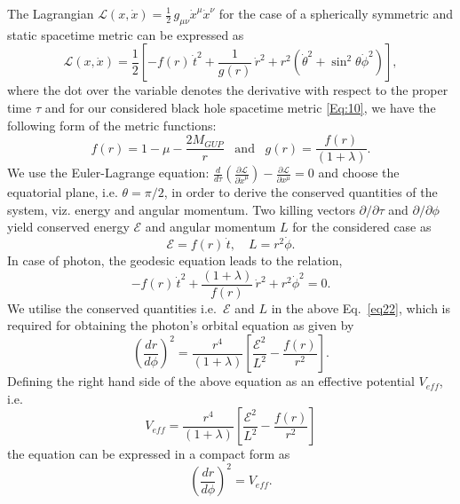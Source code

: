\documentclass[aps,amsmath,amssymb,showpacs,showkeys]{revtex4}
\begin{document}
The Lagrangian $\mathcal{L}(x,\dot{x})=\frac{1}{2}\,g_{\mu\nu}\dot{x}^{\mu}\dot{x}^{\nu}$ for the case of a spherically symmetric and static spacetime metric 
can be expressed as \cite{shnew02}
\begin{equation}
\mathcal{L}(x,\dot{x})=\frac{1}{2}\left[-f(r)\,\dot{t}^{2}+\frac{1}{g(r)}\,\dot{r}^{2}+r^{2}\left(\dot{\theta}^{2}+\sin^{2}\theta\dot{\phi}^{2}\right)\right],
\end{equation}
where the dot over the variable denotes the derivative with respect to the 
proper time $\tau$ and for our considered black hole spacetime metric 
\eqref{Eq:10}, we have the following form of the metric functions:
 $$f(r)=1-\mu-\frac{2M_{GUP}}{r} \;\;\; \text{and} \;\;\;
g(r) = \frac{f(r)}{(1+\lambda)}.$$ 
We use the Euler-Lagrange equation: 
$\frac{d}{d\tau}\!\left(\frac{\partial\mathcal{L}}{\partial\dot{x}^{\mu}}\right)-\frac{\partial\mathcal{L}}{\partial x^{\mu}}=0$ and choose the equatorial 
plane, i.e. $\theta=\pi/2$, in order to derive the conserved quantities of the
system, viz. energy and angular momentum. Two killing vectors 
$\partial/\partial \tau$ and $\partial/\partial \phi$ yield conserved energy 
$\mathcal{E}$ and angular momentum $L$ for the considered case as
\begin{equation}
\mathcal{E}=f(r)\,\dot{t},\quad L=r^{2}\dot{\phi}.
\end{equation}
In case of photon, the geodesic equation leads to the relation,
\begin{equation}\label{eq22}
-f(r)\,\dot{t}^{2}+\frac{(1+\lambda)}{f(r)}\,\dot{r}^{2}+r^{2}\dot{\phi}^{2} = 0.
\end{equation}
We utilise the conserved quantities i.e.\ $\mathcal{E}$ and $L$ in the above 
Eq.\ \eqref{eq22}, which is required for obtaining the photon's orbital 
equation as given by \cite{shnew01}
\begin{equation}\label{eff}
\left(\frac{dr}{d\phi}\right)^{2}=\frac{r^{4}}{(1+\lambda)}\left[\frac{\mathcal{E}^{2}}{L^{2}}-\frac{f(r)}{r^2}\right].
\end{equation}
Defining the right hand side of the above equation as an effective potential
$V_{eff}$, i.e.
\begin{equation}
V_{eff}=\frac{r^{4}}{(1+\lambda)}\left[\frac{\mathcal{E}^{2}}{L^{2}}-\frac{f(r)}{r^{2}}\right]
\end{equation}
the equation can be expressed in a compact form as 
\begin{equation}
\left(\frac{dr}{d\phi}\right)^{2}=V_{eff}.
\end{equation}
\end{document}
